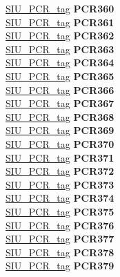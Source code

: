 \begin{DoxyCompactItemize}
\begin{tabbing}
\>\>\mbox{\hyperlink{unionSIU__tag_1_1SIU__PCR__tag}{SIU\_PCR\_tag}} {\bfseries PCR360}\\
\>\>\mbox{\hyperlink{unionSIU__tag_1_1SIU__PCR__tag}{SIU\_PCR\_tag}} {\bfseries PCR361}\\
\>\>\mbox{\hyperlink{unionSIU__tag_1_1SIU__PCR__tag}{SIU\_PCR\_tag}} {\bfseries PCR362}\\
\>\>\mbox{\hyperlink{unionSIU__tag_1_1SIU__PCR__tag}{SIU\_PCR\_tag}} {\bfseries PCR363}\\
\>\>\mbox{\hyperlink{unionSIU__tag_1_1SIU__PCR__tag}{SIU\_PCR\_tag}} {\bfseries PCR364}\\
\>\>\mbox{\hyperlink{unionSIU__tag_1_1SIU__PCR__tag}{SIU\_PCR\_tag}} {\bfseries PCR365}\\
\>\>\mbox{\hyperlink{unionSIU__tag_1_1SIU__PCR__tag}{SIU\_PCR\_tag}} {\bfseries PCR366}\\
\>\>\mbox{\hyperlink{unionSIU__tag_1_1SIU__PCR__tag}{SIU\_PCR\_tag}} {\bfseries PCR367}\\
\>\>\mbox{\hyperlink{unionSIU__tag_1_1SIU__PCR__tag}{SIU\_PCR\_tag}} {\bfseries PCR368}\\
\>\>\mbox{\hyperlink{unionSIU__tag_1_1SIU__PCR__tag}{SIU\_PCR\_tag}} {\bfseries PCR369}\\
\>\>\mbox{\hyperlink{unionSIU__tag_1_1SIU__PCR__tag}{SIU\_PCR\_tag}} {\bfseries PCR370}\\
\>\>\mbox{\hyperlink{unionSIU__tag_1_1SIU__PCR__tag}{SIU\_PCR\_tag}} {\bfseries PCR371}\\
\>\>\mbox{\hyperlink{unionSIU__tag_1_1SIU__PCR__tag}{SIU\_PCR\_tag}} {\bfseries PCR372}\\
\>\>\mbox{\hyperlink{unionSIU__tag_1_1SIU__PCR__tag}{SIU\_PCR\_tag}} {\bfseries PCR373}\\
\>\>\mbox{\hyperlink{unionSIU__tag_1_1SIU__PCR__tag}{SIU\_PCR\_tag}} {\bfseries PCR374}\\
\>\>\mbox{\hyperlink{unionSIU__tag_1_1SIU__PCR__tag}{SIU\_PCR\_tag}} {\bfseries PCR375}\\
\>\>\mbox{\hyperlink{unionSIU__tag_1_1SIU__PCR__tag}{SIU\_PCR\_tag}} {\bfseries PCR376}\\
\>\>\mbox{\hyperlink{unionSIU__tag_1_1SIU__PCR__tag}{SIU\_PCR\_tag}} {\bfseries PCR377}\\
\>\>\mbox{\hyperlink{unionSIU__tag_1_1SIU__PCR__tag}{SIU\_PCR\_tag}} {\bfseries PCR378}\\
\>\>\mbox{\hyperlink{unionSIU__tag_1_1SIU__PCR__tag}{SIU\_PCR\_tag}} {\bfseries PCR379}\\

\end{tabbing}
\end{DoxyCompactItemize}
